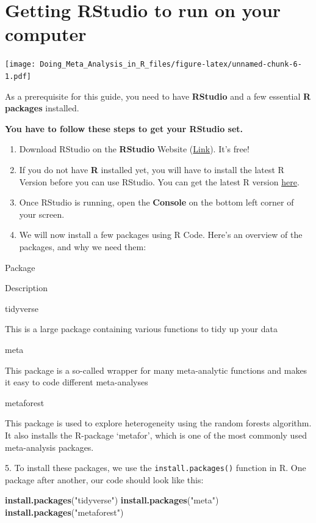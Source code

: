 \documentclass[]{book}
\newenvironment{Shaded}{\begin{snugshade}}{\end{snugshade}}
\newcommand{\KeywordTok}[1]{\textcolor[rgb]{0.13,0.29,0.53}{\textbf{#1}}}
\newcommand{\NormalTok}[1]{#1}
\newcommand{\StringTok}[1]{\textcolor[rgb]{0.31,0.60,0.02}{#1}}
\providecommand{\tightlist}{%
  \setlength{\itemsep}{0pt}\setlength{\parskip}{0pt}}
\begin{document}
\hypertarget{RStudio}{%
\section{Getting RStudio to run on your computer}\label{RStudio}}

\texttt{[image: Doing\_Meta\_Analysis\_in\_R\_files/figure-latex/unnamed-chunk-6-1.pdf]}

As a prerequisite for this guide, you need to have \textbf{RStudio} and a few essential \textbf{R packages} installed.

\textbf{You have to follow these steps to get your RStudio set.}

\begin{enumerate}
\def\labelenumi{\arabic{enumi}.}
\tightlist
\item
  Download RStudio on the \textbf{RStudio} Website (\href{https://www.rstudio.com/products/rstudio/download/}{Link}). It's free!
\item
  If you do not have \textbf{R} installed yet, you will have to install the latest R Version before you can use RStudio. You can get the latest R version \href{https://cran.r-project.org/bin/windows/base/}{here}.
\item
  Once RStudio is running, open the \textbf{Console} on the bottom left corner of your screen.
\item
  We will now install a few packages using R Code. Here's an overview of the packages, and why we need them:
\end{enumerate}

Package

Description

tidyverse

This is a large package containing various functions to tidy up your data

meta

This package is a so-called wrapper for many meta-analytic functions and makes it easy to code different meta-analyses

metaforest

This package is used to explore heterogeneity using the random forests algorithm. It also installs the R-package `metafor', which is one of the most commonly used meta-analysis packages.

5. To install these packages, we use the \texttt{install.packages()} function in R. One package after another, our code should look like this:

\begin{Shaded}
\begin{Highlighting}[]
\KeywordTok{install.packages}\NormalTok{(}\StringTok{"tidyverse"}\NormalTok{)}
\KeywordTok{install.packages}\NormalTok{(}\StringTok{"meta"}\NormalTok{)}
\KeywordTok{install.packages}\NormalTok{(}\StringTok{"metaforest"}\NormalTok{)}
\end{Highlighting}
\end{Shaded}
\end{document}
